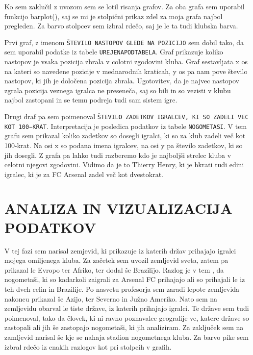 \documentclass[11pt,a4paper]{article}
\begin{document}
Ko sem zaklučil z uvozom sem se lotil risanja grafov. Za oba grafa sem uporabil funkcijo barplot(), saj se mi je stolpični prikaz zdel za moja grafa najbol pregleden. Za barvo stolpcev sem izbral rdečo, saj je le ta tudi klubska barva. 

Prvi graf, z imenom \verb|ŠTEVILO NASTOPOV GLEDE NA POZICIJO| sem dobil tako, da sem uporabil podatke iz tabele \verb|UREJENAPODTABELA|. Graf prikazuje koliko nastopov je vsaka pozicija zbrala v colotni zgodovini kluba. Graf sestavljata x os na kateri so navedene pozicije v mednarodnih kraticah, y os pa nam pove število nastopov, ki jih je določena pozicija zbrala. Ugotovitev, da je najvec nastopov zgrala pozicija veznega igralca ne preseneča, saj so bili in so vezisti v klubu najbol zastopani in se temu podreja tudi sam sistem igre. 

Drugi draf pa sem poimenoval \verb|ŠTEVILO ZADETKOV IGRALCEV, KI SO ZADELI VEC KOT 100−KRAT|. Interpretacija je posledica podatkov iz tabele \verb|NOGOMETASI|. V tem grafu sem prikazal koliko zadetkov so dosegli igralci, ki so za klub zadeli več kot 100-krat. Na osi x so podana imena igralcev, na osi y pa število zadetkov, ki so jih dosegli. Z grafa pa lahko tudi razberemo kdo je najboljši strelec kluba v celotni njegovi zgodovini. Vidimo da je to Thierry Henry, ki je hkrati tudi edini igralec, ki je za FC Arsenal zadel več kot dvestokrat.




\newpage
\section{ANALIZA IN VIZUALIZACIJA PODATKOV}
V tej fazi sem narisal zemjevid, ki prikazuje iz katerih držav prihajajo igralci mojega omiljenega kluba. Za začetek sem uvozil zemljevid sveta, zatem pa prikazal le Evropo ter Afriko, ter dodal še Brazilijo. Razlog je v tem , da nogometaši, ki so kadarkoli zaigrali za Arsenal FC prihajajo ali so prihajali le iz teh dveh celin in Brazilije. Po nasvetu profesorja sem zaradi lepote zemljevida nakoncu prikazal še Azijo, ter Severno in Južno Ameriko. Nato sem na zemljevidu obarval le tiste države, iz katerih prihajajo igralci. Te države sem tudi poimenoval, tako da človek, ki ni ravno poznavalec geografije ve, katere države so zastopali ali jih še zastopajo nogometaši, ki jih analiziram. Za zaključek sem na zamljevid narisal še kje se nahaja stadion nogometnega kluba. Za barvo pike sem izbral rdečo iz enakih razlogov kot pri stolpcih v grafih.
\end{document}
